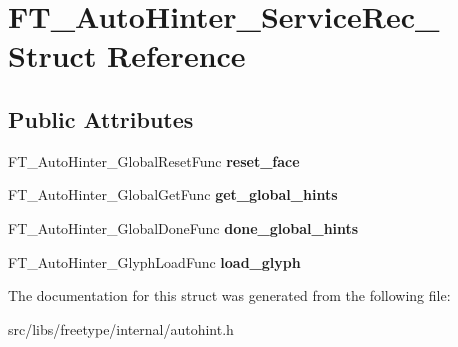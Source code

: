\hypertarget{struct_f_t___auto_hinter___service_rec__}{
\section{FT\_\-AutoHinter\_\-ServiceRec\_\- Struct Reference}
\label{struct_f_t___auto_hinter___service_rec__}
}
\subsection*{Public Attributes}
\begin{DoxyCompactItemize}
\item 
\hypertarget{struct_f_t___auto_hinter___service_rec___a846234a9c9c5427d3274e4568f33272c}{
FT\_\-AutoHinter\_\-GlobalResetFunc {\bfseries reset\_\-face}}
\label{struct_f_t___auto_hinter___service_rec___a846234a9c9c5427d3274e4568f33272c}

\item 
\hypertarget{struct_f_t___auto_hinter___service_rec___a958371c33e08125393cd4b401a22f2a0}{
FT\_\-AutoHinter\_\-GlobalGetFunc {\bfseries get\_\-global\_\-hints}}
\label{struct_f_t___auto_hinter___service_rec___a958371c33e08125393cd4b401a22f2a0}

\item 
\hypertarget{struct_f_t___auto_hinter___service_rec___a648ac943fc1194f60ba638e0a59486e9}{
FT\_\-AutoHinter\_\-GlobalDoneFunc {\bfseries done\_\-global\_\-hints}}
\label{struct_f_t___auto_hinter___service_rec___a648ac943fc1194f60ba638e0a59486e9}

\item 
\hypertarget{struct_f_t___auto_hinter___service_rec___ad36efe39469959626744ebdd04a04031}{
FT\_\-AutoHinter\_\-GlyphLoadFunc {\bfseries load\_\-glyph}}
\label{struct_f_t___auto_hinter___service_rec___ad36efe39469959626744ebdd04a04031}

\end{DoxyCompactItemize}


The documentation for this struct was generated from the following file:\begin{DoxyCompactItemize}
\item 
src/libs/freetype/internal/autohint.h\end{DoxyCompactItemize}
